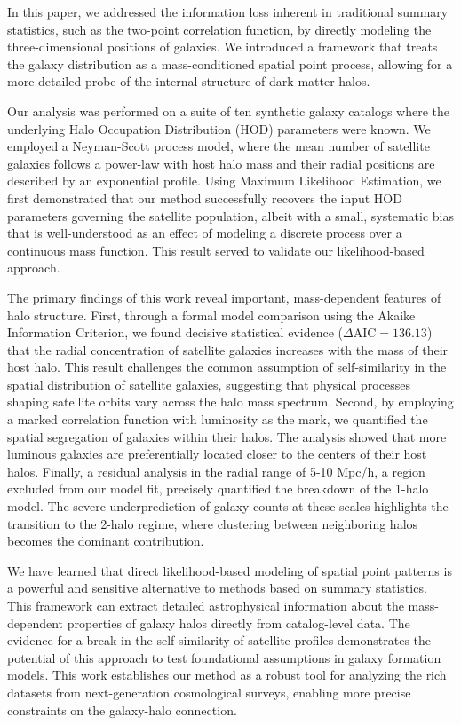 \documentclass[]{article}
\begin{document}
In this paper, we addressed the information loss inherent in traditional summary statistics, such as the two-point correlation function, by directly modeling the three-dimensional positions of galaxies. We introduced a framework that treats the galaxy distribution as a mass-conditioned spatial point process, allowing for a more detailed probe of the internal structure of dark matter halos.

Our analysis was performed on a suite of ten synthetic galaxy catalogs where the underlying Halo Occupation Distribution (HOD) parameters were known. We employed a Neyman-Scott process model, where the mean number of satellite galaxies follows a power-law with host halo mass and their radial positions are described by an exponential profile. Using Maximum Likelihood Estimation, we first demonstrated that our method successfully recovers the input HOD parameters governing the satellite population, albeit with a small, systematic bias that is well-understood as an effect of modeling a discrete process over a continuous mass function. This result served to validate our likelihood-based approach.

The primary findings of this work reveal important, mass-dependent features of halo structure. First, through a formal model comparison using the Akaike Information Criterion, we found decisive statistical evidence ($\Delta \text{AIC} = 136.13$) that the radial concentration of satellite galaxies increases with the mass of their host halo. This result challenges the common assumption of self-similarity in the spatial distribution of satellite galaxies, suggesting that physical processes shaping satellite orbits vary across the halo mass spectrum. Second, by employing a marked correlation function with luminosity as the mark, we quantified the spatial segregation of galaxies within their halos. The analysis showed that more luminous galaxies are preferentially located closer to the centers of their host halos. Finally, a residual analysis in the radial range of 5-10 Mpc/h, a region excluded from our model fit, precisely quantified the breakdown of the 1-halo model. The severe underprediction of galaxy counts at these scales highlights the transition to the 2-halo regime, where clustering between neighboring halos becomes the dominant contribution.

We have learned that direct likelihood-based modeling of spatial point patterns is a powerful and sensitive alternative to methods based on summary statistics. This framework can extract detailed astrophysical information about the mass-dependent properties of galaxy halos directly from catalog-level data. The evidence for a break in the self-similarity of satellite profiles demonstrates the potential of this approach to test foundational assumptions in galaxy formation models. This work establishes our method as a robust tool for analyzing the rich datasets from next-generation cosmological surveys, enabling more precise constraints on the galaxy-halo connection.
\end{document}
